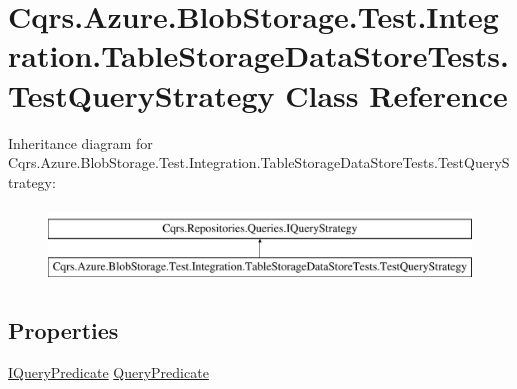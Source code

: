 \hypertarget{classCqrs_1_1Azure_1_1BlobStorage_1_1Test_1_1Integration_1_1TableStorageDataStoreTests_1_1TestQueryStrategy}{}\section{Cqrs.\+Azure.\+Blob\+Storage.\+Test.\+Integration.\+Table\+Storage\+Data\+Store\+Tests.\+Test\+Query\+Strategy Class Reference}
\label{classCqrs_1_1Azure_1_1BlobStorage_1_1Test_1_1Integration_1_1TableStorageDataStoreTests_1_1TestQueryStrategy}
Inheritance diagram for Cqrs.\+Azure.\+Blob\+Storage.\+Test.\+Integration.\+Table\+Storage\+Data\+Store\+Tests.\+Test\+Query\+Strategy\+:\begin{figure}[H]
\begin{center}
\leavevmode
\includegraphics[height=2.000000cm]{classCqrs_1_1Azure_1_1BlobStorage_1_1Test_1_1Integration_1_1TableStorageDataStoreTests_1_1TestQueryStrategy}
\end{center}
\end{figure}
\subsection*{Properties}
\begin{DoxyCompactItemize}
\item 
\hyperlink{interfaceCqrs_1_1Repositories_1_1Queries_1_1IQueryPredicate}{I\+Query\+Predicate} \hyperlink{classCqrs_1_1Azure_1_1BlobStorage_1_1Test_1_1Integration_1_1TableStorageDataStoreTests_1_1TestQueryStrategy_a737d64c44c933d9a0d8e3b4ad3aee715_a737d64c44c933d9a0d8e3b4ad3aee715}{Query\+Predicate}
\end{DoxyCompactItemize}


